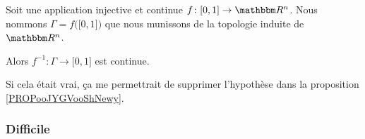 \begin{enumerate}
        \begin{proposition}
            Soit une application injective et continue \( f\colon \mathopen[ 0 , 1 \mathclose]\to \eR^n\). Nous nommons \( \Gamma=f\big( \mathopen[ 0 , 1 \mathclose] \big)\) que nous munissons de la topologie induite de \( \eR^n\).

            Alors \( f^{-1}\colon \Gamma\to\mathopen[ 0 , 1 \mathclose]\) est continue.
        \end{proposition}
        
        Si cela était vrai, ça me permettrait de supprimer l'hypothèse dans la proposition \ref{PROPooJYGVooShNewy}.
\end{enumerate}

\subsubsection{Difficile}

